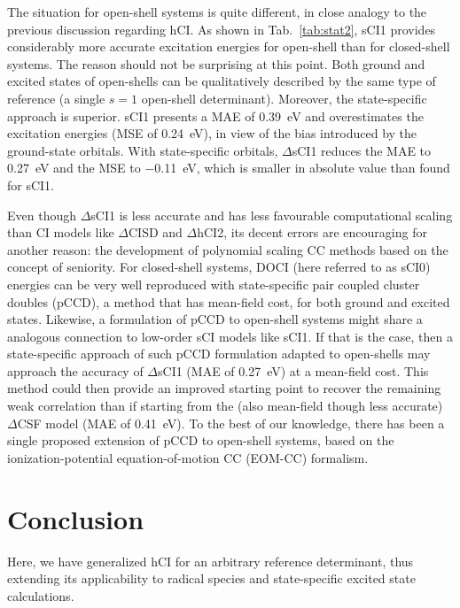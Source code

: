 \documentclass[aip,jcp,reprint,noshowkeys,superscriptaddress]{revtex4-1}
\begin{document}
The situation for open-shell systems is quite different, in close analogy to the previous discussion regarding hCI.
As shown in Tab.~\ref{tab:stat2}, sCI1 provides considerably more accurate excitation energies for open-shell than for closed-shell systems.
The reason should not be surprising at this point.
Both ground and excited states of open-shells can be qualitatively described by the same type of reference (a single $s=1$ open-shell determinant).
Moreover, the state-specific approach is superior.
sCI1 presents a MAE of \SI{0.39}{\eV} and overestimates the excitation energies (MSE of \SI{+0.24}{\eV}), in view of the bias introduced by the ground-state orbitals.
With state-specific orbitals, $\Delta$sCI1 reduces the MAE to \SI{0.27}{\eV} and the MSE to \SI{-0.11}{\eV}, which is smaller in absolute value than found for sCI1.

Even though $\Delta$sCI1 is less accurate and has less favourable computational scaling than CI models like $\Delta$CISD and $\Delta$hCI2,
its decent errors are encouraging for another reason:
the development of polynomial scaling CC methods based on the concept of seniority.
For closed-shell systems, DOCI (here referred to as sCI0) energies can be very well reproduced with state-specific pair coupled cluster doubles (pCCD), a method that has mean-field cost,
for both ground \cite{Bytautas_2011,Allen_1962,Smith_1965,Veillard_1967} and excited \cite{Kossoski_2021,Marie_2021} states.
Likewise, a formulation of pCCD to open-shell systems might share a analogous connection to low-order sCI models like sCI1.
If that is the case, then a state-specific approach of such pCCD formulation adapted to open-shells may approach the accuracy of $\Delta$sCI1 (MAE of \SI{0.27}{\eV}) at a mean-field cost.
This method could then provide an improved starting point to recover the remaining weak correlation than if starting from the (also mean-field though less accurate) $\Delta$CSF model (MAE of \SI{0.41}{\eV}).
To the best of our knowledge, there has been a single proposed extension of pCCD to open-shell systems, \cite{Boguslawski_2021}
based on the ionization-potential equation-of-motion CC (EOM-CC) formalism.


\section{Conclusion}
\label{sec:conclusion}

Here, we have generalized hCI \cite{Kossoski_2022} for an arbitrary reference determinant, thus extending its applicability to radical species and state-specific excited state calculations.
\end{document}
